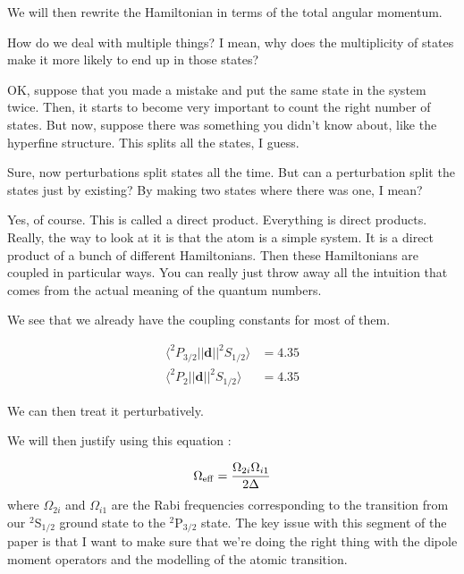We will then rewrite the Hamiltonian in terms of the total angular momentum. 

How do we deal with multiple things? I mean, why does the multiplicity of states make it more likely to end up in those states? 

OK, suppose that you made a mistake and put the same state in the system twice. Then, it starts to become very important to count the right number of states. But now, suppose there was something you didn't know about, like the hyperfine structure. This splits all the states, I guess. 

Sure, now perturbations split states all the time. But can a perturbation split the states just by existing? By making two states where there was one, I mean? 

Yes, of course. This is called a direct product. Everything is direct products. Really, the way to look at it is that the atom is a simple system. It is a direct product of a bunch of different Hamiltonians. Then these Hamiltonians are coupled in particular ways. You can really just throw away all the intuition that comes from the actual meaning of the quantum numbers. 


We see that we already have the coupling constants for most of them. %

\begin{align}
\langle ^2 P_{3/2}||\mathbf{d}||^2 S_{1/2} \rangle &= 4.35 \\
\langle ^2 P_{2}||\mathbf{d}||^2 S_{1/2} \rangle &= 4.35
\end{align}

We can then treat it perturbatively. 

We will then justify using this equation \cite{footAtomicPhysics} \cite{RamanBeamSplit}: 

\begin{equation}
\Omega_{\rm eff}=\frac{\Omega_{2i} \Omega_{i1}}{2 \Delta}
\end{equation}
where $\Omega_{2i}$ and $\Omega_{i1}$ are the Rabi frequencies corresponding to the transition from our $^2$S$_{1/2}$ ground state to the  $^2$P$_{3/2}$ state. 
The key issue with this segment of the paper is that I want to make sure that we're doing the right thing with the dipole moment operators and the modelling of the atomic transition.  %

